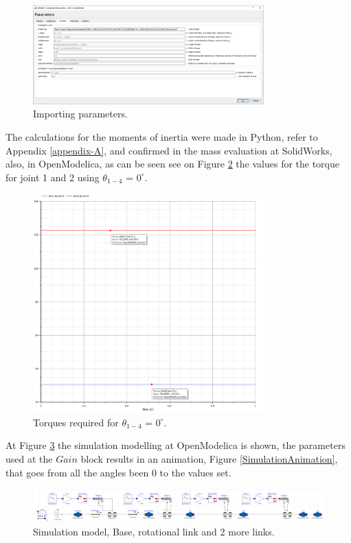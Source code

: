 \documentclass[transmag]{IEEEtran}
\begin{document}
\begin{figure}
\centerline{\includegraphics[width=3.5in]{./images/importOpenModelicaParameters}}
\caption{Importing parameters.\label{importOpenModelicaParameters}}
\end{figure}


The calculations for the moments of inertia were made in Python, refer to Appendix \ref{appendix-A}, and confirmed in the mass evaluation at SolidWorks, also, in OpenModelica, as can be seen see on Figure \ref{taus} the values for the torque for joint 1 and 2 using $\theta_{1-4}$ = $0^{\circ}$.

\begin{figure}
\centerline{\includegraphics[width=3.5in]{./images/taus}}
\caption{Torques required for $\theta_{1-4}$ = $0^{\circ}$.\label{taus}}
\end{figure}


At Figure \ref{Simulation} the simulation modelling at OpenModelica is shown, the parameters used at the $Gain$ block results in an animation, Figure \ref{SimulationAnimation}, that goes from all the angles been 0 to the values set.

\begin{figure}
\centerline{\includegraphics[width=7in]{./images/Simulation}}
\caption{Simulation model, Base, rotational link and 2 more links.\label{Simulation}}
\end{figure}
\end{document}
